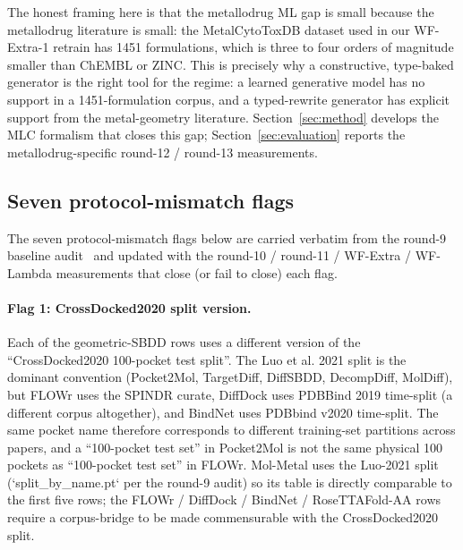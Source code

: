 The honest framing here is that the metallodrug ML gap is small
because the metallodrug literature is small: the MetalCytoToxDB
dataset used in our WF-Extra-1 retrain has 1451 formulations, which
is three to four orders of magnitude smaller than ChEMBL or ZINC.
This is precisely why a constructive, type-baked generator is the
right tool for the regime: a learned generative model has no
support in a 1451-formulation corpus, and a typed-rewrite
generator has explicit support from the metal-geometry
literature. Section~\ref{sec:method} develops the MLC formalism
that closes this gap; Section~\ref{sec:evaluation} reports the
metallodrug-specific round-12 / round-13 measurements.

\subsection{Seven protocol-mismatch flags}
\label{sec:related:protocol}

The seven protocol-mismatch flags below are carried verbatim from the
round-9 baseline audit~\cite{footnote:lambda_protocol_aligned} and
updated with the round-10 / round-11 / WF-Extra / WF-Lambda
measurements that close (or fail to close) each flag.

\paragraph{Flag 1: CrossDocked2020 split version.}
Each of the geometric-SBDD rows uses a different version of the
``CrossDocked2020 100-pocket test split''. The Luo et al. 2021 split
is the dominant convention (Pocket2Mol, TargetDiff, DiffSBDD,
DecompDiff, MolDiff), but FLOWr uses the SPINDR curate, DiffDock uses
PDBBind 2019 time-split (a different corpus altogether), and BindNet
uses PDBbind v2020 time-split. The same pocket name therefore
corresponds to different training-set partitions across papers, and a
``100-pocket test set'' in Pocket2Mol is not the same physical 100
pockets as ``100-pocket test set'' in FLOWr. Mol-Metal uses the
Luo-2021 split (`split\_by\_name.pt` per the round-9 audit) so its
table is directly comparable to the first five rows; the FLOWr /
DiffDock / BindNet / RoseTTAFold-AA rows require a corpus-bridge to be
made commensurable with the CrossDocked2020 split.


